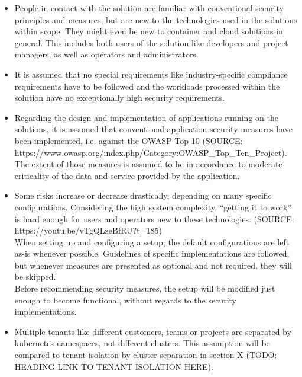 \begin{itemize}

\item People in contact with the solution are familiar with conventional security principles and measures, but are new to the technologies used in the solutions within scope. They might even be new to container and cloud solutions in general. This includes both users of the solution like developers and project managers, as well as operators and administrators.

\item It is assumed that no special requirements like industry-specific compliance requirements have to be followed and the workloads processed within the solution have no exceptionally high security requirements. 

\item Regarding the design and implementation of applications running on the solutions, it is assumed that conventional application security measures have been implemented, i.e. against the OWASP Top 10 (SOURCE: https://www.owasp.org/index.php/Category:OWASP_Top_Ten_Project).\\
	The extent of those measures is assumed to be in accordance to moderate criticality of the data and service provided by the application.

\item Some risks increase or decrease drastically, depending on many specific configurations. Considering the high system complexity, ``getting it to work'' is hard enough for users and operators new to these technologies. (SOURCE: https://youtu.be/vTgQLzeBfRU?t=185)  \\
	When setting up and configuring a setup, the default configurations are left as-is whenever possible. Guidelines of specific implementations are followed, but whenever measures are presented as optional and not required, they will be skipped. \\
	Before recommending security measures, the setup will be modified just enough to become functional, without regards to the security implementations.

\item Multiple tenants like different customers, teams or projects are separated by kubernetes namespaces, not different clusters. This assumption will be compared to tenant isolation by cluster separation in section X (TODO: HEADING LINK TO TENANT ISOLATION HERE).

\end{itemize}



